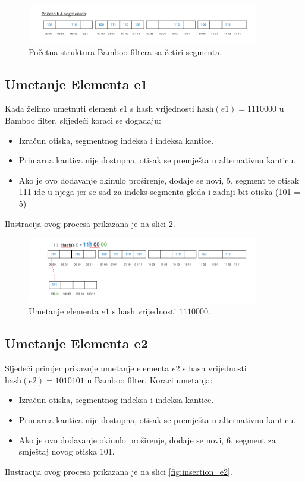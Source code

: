 \documentclass[seminarskirad]{fer}
\begin{document}
	
	\begin{figure}[h]
		\centering
		\includegraphics[width=0.9\textwidth]{images/initial_segments.png}
		\caption{Početna struktura Bamboo filtera sa četiri segmenta.}
		\label{fig:initial_segments}
	\end{figure}
	
	\subsection{Umetanje Elementa e1}
	Kada želimo umetnuti element \( e1 \) s hash vrijednosti \( \text{hash}(e1) = 1110000 \) u Bamboo filter, slijedeći koraci se događaju:
	\begin{itemize}
		\item Izračun otiska, segmentnog indeksa i indeksa kantice.
		\item Primarna kantica nije dostupna, otisak se premješta u alternativnu kanticu.
		\item Ako je ovo dodavanje okinulo proširenje, dodaje se novi, 5. segment te otisak 111 ide u njega jer se sad za indeks segmenta gleda i zadnji bit otiska (101 = 5)
	\end{itemize}
	Ilustracija ovog procesa prikazana je na slici \ref{fig:insertion_e1}.
	
	\begin{figure}[h]
		\centering
		\includegraphics[width=0.9\textwidth]{images/umetanje_el1.png}
		\caption{Umetanje elementa \( e1 \) s hash vrijednosti \( 1110000 \).}
		\label{fig:insertion_e1}
	\end{figure}
	
	\subsection{Umetanje Elementa e2}
	Sljedeći primjer prikazuje umetanje elementa \( e2 \) s hash vrijednosti \( \text{hash}(e2) = 1010101 \) u Bamboo filter. Koraci umetanja:
	\begin{itemize}
		\item Izračun otiska, segmentnog indeksa i indeksa kantice.
		\item Primarna kantica nije dostupna, otisak se premješta u alternativnu kanticu.
		\item Ako je ovo dodavanje okinulo proširenje, dodaje se novi, 6. segment za smještaj novog otiska 101.
	\end{itemize}
	Ilustracija ovog procesa prikazana je na slici \ref{fig:insertion_e2}.
	
\end{document}
